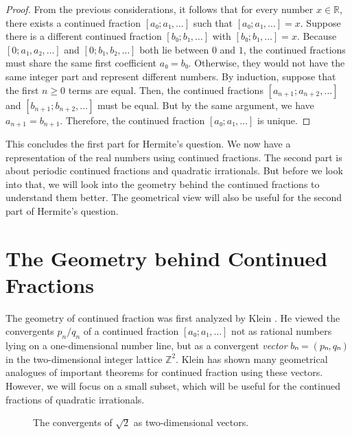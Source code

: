 \begin{proof}
  From the previous considerations, it follows that for every number $x ∈ ℝ$,
  there exists a continued fraction $[a₀; a₁, …]$ such that $[a₀; a₁, …] = x$.
  Suppose there is a different continued fraction $[b₀; b₁, …]$ with $[b₀; b₁, …] = x$.
  Because $[0; a₁, a₂, …]$ and $[0; b₁, b₂, …]$ both lie between $0$ and $1$,
  the continued fractions must share the same first coefficient $a₀ = b₀$.
  Otherwise, they would not have the same integer part and represent different numbers.
  By induction, suppose that the first $n ≥ 0$ terms are equal.
  Then, the continued fractions $[a_{n+1}; a_{n+2}, …]$ and $[b_{n+1}; b_{n+2}, …]$ must be equal.
  But by the same argument, we have $a_{n+1} = b_{n+1}$.
  Therefore, the continued fraction $[a₀; a₁, …]$ is unique.
\end{proof}

This concludes the first part for Hermite's question.
We now have a representation of the real numbers using continued fractions.
The second part is about periodic continued fractions and quadratic irrationals.
But before we look into that, we will look into the geometry behind the continued fractions
to understand them better.
The geometrical view will also be useful for the second part of Hermite's question.

\section{The Geometry behind Continued Fractions}

The geometry of continued fraction was first analyzed by Klein \cite{Klein95}.
He viewed the convergents $p_n/q_n$ of a continued fraction $[a₀; a₁, …]$ not
as rational numbers lying on a one-dimensional number line,
but as a convergent \emph{vector} $bₙ = (pₙ, qₙ)$ in the two-dimensional integer lattice $ℤ^2$.
Klein has shown many geometrical analogues of important theorems for continued fraction
using these vectors.
However, we will focus on a small subset, which will be useful for the
continued fractions of quadratic irrationals.

\begin{figure}[tb]
  \centering
  
  \caption{
    The convergents of $\sqrt{2}$ as two-dimensional vectors.
  }
  \label{fig:klein-polygon}
\end{figure}

